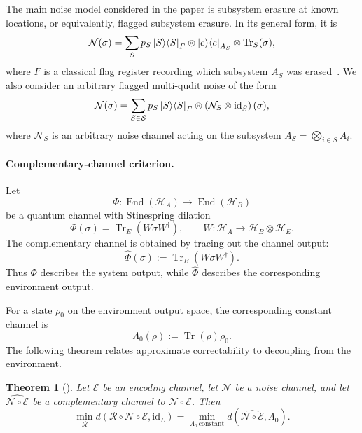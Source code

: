 \documentclass[10pt,twocolumn,superscriptaddress,aps,amsmath,amssymb,citeautoscript,floatfix,prx,longbibliography]{revtex4-2}
\newtheorem{theorem}{Theorem}
\theoremstyle{plain}
\theoremstyle{plain}
\theoremstyle{plain}
\theoremstyle{plain}
\theoremstyle{plain}
\theoremstyle{plain}
\begin{document}
The main noise model considered in the paper is subsystem erasure at known locations, or equivalently, flagged subsystem erasure. In its general form, it is
\begin{equation}\label{eq:erasure_noise}
    \mathcal N(\sigma)
    =
    \sum_S
    p_S
    \ket S\!\bra S_F
    \otimes
    \ket e\!\bra e_{A_S}
    \otimes
    \operatorname{Tr}_S(\sigma),
\end{equation}
where $F$ is a classical flag register recording which subsystem $A_S$ was erased~\cite{Faist2020}. We also consider an arbitrary flagged multi-qudit noise of the form
\begin{equation}\label{eq:arbitrary_multiqudit_noise}
    \mathcal N(\sigma)
    =
    \sum_{S\in\mathcal S}
    p_S
    \ket S\!\bra S_F
    \otimes
    \left(
        \mathcal N_S
        \otimes
        \mathrm{id}_{\bar S}
    \right)(\sigma),
\end{equation}
where $\mathcal N_S$ is an arbitrary noise channel acting on the subsystem $A_S=\bigotimes_{i\in S}A_i$.

\paragraph{Complementary-channel criterion.}
Let 
$$\Phi:\operatorname{End}(\mathcal H_A)\to\operatorname{End}(\mathcal H_B)
$$ 
be a quantum channel with Stinespring dilation
$$
\Phi(\sigma)
=
\operatorname{Tr}_E(W\sigma W^\dagger),
\qquad
W:\mathcal H_A\to\mathcal H_B\otimes\mathcal H_E .
$$
The complementary channel is obtained by tracing out the channel output:
$$
\widehat\Phi(\sigma)
:=
\operatorname{Tr}_B(W\sigma W^\dagger).
$$
Thus $\Phi$ describes the system output, while $\widehat\Phi$ describes the corresponding environment output.

For a state $\rho_0$ on the environment output space, the corresponding constant channel is
\begin{equation}\label{eq:constant_channel_def}
\Lambda_0(\rho)
:=
\operatorname{Tr}(\rho)\rho_0 .
\end{equation}
The following theorem relates approximate correctability to decoupling from the environment.

\begin{theorem}[\citet{Beny2010}]\label{thm:beny}
Let $\mathcal E$ be an encoding channel, let $\mathcal N$ be a noise channel, and let $\widehat{\mathcal N\circ\mathcal E}$ be a complementary channel to $\mathcal N\circ\mathcal E$. Then
\begin{equation}\label{eq:beny}
    \min_{\mathcal R}
    d\left(
        \mathcal R\circ\mathcal N\circ\mathcal E,
        \mathrm{id}_L
    \right)
    =
    \min_{\Lambda_0\,\mathrm{constant}}
    d\left(
        \widehat{\mathcal N\circ\mathcal E},
        \Lambda_0
    \right).
\end{equation}
\end{theorem}
\end{document}
